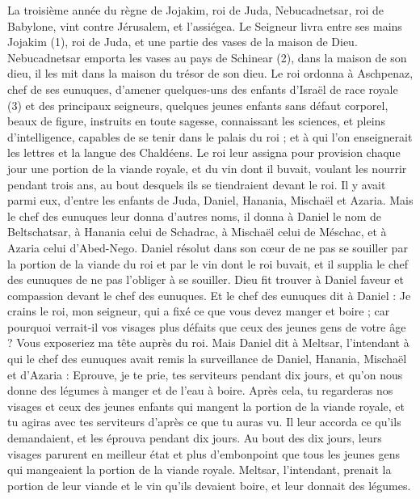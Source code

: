 \begin{multicols}{2}
\VerseOne{}La troisième année du règne de Jojakim, roi de Juda, Nebucadnetsar, roi de Babylone, vint contre Jérusalem, et l'assiégea.
Le Seigneur livra entre ses mains Jojakim (1), roi de Juda, et une partie des vases de la maison de Dieu. Nebucadnetsar emporta les vases au pays de Schinear (2), dans la maison de son dieu, il les mit dans la maison du trésor de son dieu.
Le roi ordonna à Aschpenaz, chef de ses eunuques, d’amener quelques-uns des enfants d'Israël de race royale (3)  et des principaux seigneurs,
quelques jeunes enfants sans défaut corporel, beaux de figure, instruits en toute sagesse, connaissant les sciences, et pleins d'intelligence, capables de se tenir dans le palais du roi ; et à qui l’on enseignerait les lettres et la langue des Chaldéens.
Le roi leur assigna pour provision chaque jour une portion de la viande royale, et du vin dont il buvait, voulant les nourrir pendant trois ans, au bout desquels ils se tiendraient devant le roi.
Il y avait parmi eux, d’entre les enfants de Juda, Daniel, Hanania, Mischaël et Azaria.
Mais le chef des eunuques leur donna d'autres noms, il donna à Daniel le nom de Beltschatsar, à Hanania celui de Schadrac, à Mischaël celui de Méschac, et à Azaria celui d'Abed-Nego.
Daniel résolut dans son cœur de ne pas se souiller par la portion de la viande du roi et par le vin dont le roi buvait,  et il supplia le chef des eunuques de ne pas l’obliger à se souiller.
Dieu fit trouver à Daniel faveur et compassion devant le chef des eunuques.
Et le chef des eunuques dit à Daniel : Je crains le roi, mon seigneur, qui a fixé ce que vous devez manger et boire ; car pourquoi verrait-il vos visages plus défaits que ceux des jeunes gens de votre âge ? Vous exposeriez ma tête auprès du roi.
Mais Daniel dit à Meltsar, l’intendant à qui le chef des eunuques avait remis la surveillance de Daniel, Hanania, Mischaël et d’Azaria :
Eprouve, je te prie, tes serviteurs pendant dix jours, et qu'on nous donne des légumes à manger et de l'eau à boire.
Après cela, tu regarderas nos visages et ceux des jeunes enfants qui mangent la portion de la viande royale, et tu agiras avec tes serviteurs d’après ce que tu auras vu.
Il leur accorda ce qu’ils demandaient, et les éprouva pendant dix jours.
Au bout des dix jours, leurs visages parurent en meilleur état et plus d'embonpoint que tous les jeunes gens qui mangeaient la portion de la viande royale.
Meltsar, l’intendant, prenait la portion de leur viande et le vin qu'ils devaient boire, et leur donnait des légumes.

\end{multicols}
